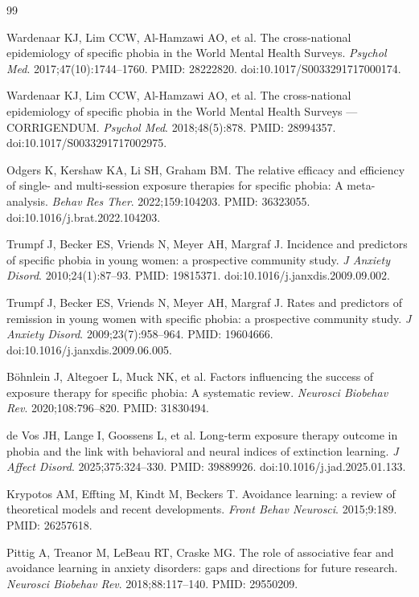 \documentclass[9pt,twocolumn]{article}
\begin{document}
\begin{thebibliography}{99}
\footnotesize
\setlength{\itemsep}{0.10em}
\setlength{\parskip}{0pt}

Wardenaar KJ, Lim CCW, Al-Hamzawi AO, et al. The cross-national epidemiology of specific phobia in the World Mental Health Surveys. \emph{Psychol Med}. 2017;47(10):1744--1760. PMID: 28222820. doi:10.1017/S0033291717000174.

Wardenaar KJ, Lim CCW, Al-Hamzawi AO, et al. The cross-national epidemiology of specific phobia in the World Mental Health Surveys --- CORRIGENDUM. \emph{Psychol Med}. 2018;48(5):878. PMID: 28994357. doi:10.1017/S0033291717002975.

Odgers K, Kershaw KA, Li SH, Graham BM. The relative efficacy and efficiency of single- and multi-session exposure therapies for specific phobia: A meta-analysis. \emph{Behav Res Ther}. 2022;159:104203. PMID: 36323055. doi:10.1016/j.brat.2022.104203.

Trumpf J, Becker ES, Vriends N, Meyer AH, Margraf J. Incidence and predictors of specific phobia in young women: a prospective community study. \emph{J Anxiety Disord}. 2010;24(1):87--93. PMID: 19815371. doi:10.1016/j.janxdis.2009.09.002.

Trumpf J, Becker ES, Vriends N, Meyer AH, Margraf J. Rates and predictors of remission in young women with specific phobia: a prospective community study. \emph{J Anxiety Disord}. 2009;23(7):958--964. PMID: 19604666. doi:10.1016/j.janxdis.2009.06.005.

B\"ohnlein J, Altegoer L, Muck NK, et al. Factors influencing the success of exposure therapy for specific phobia: A systematic review. \emph{Neurosci Biobehav Rev}. 2020;108:796--820. PMID: 31830494.

de Vos JH, Lange I, Goossens L, et al. Long-term exposure therapy outcome in phobia and the link with behavioral and neural indices of extinction learning. \emph{J Affect Disord}. 2025;375:324--330. PMID: 39889926. doi:10.1016/j.jad.2025.01.133.

Krypotos AM, Effting M, Kindt M, Beckers T. Avoidance learning: a review of theoretical models and recent developments. \emph{Front Behav Neurosci}. 2015;9:189. PMID: 26257618.

Pittig A, Treanor M, LeBeau RT, Craske MG. The role of associative fear and avoidance learning in anxiety disorders: gaps and directions for future research. \emph{Neurosci Biobehav Rev}. 2018;88:117--140. PMID: 29550209.


\end{thebibliography}
\end{document}

